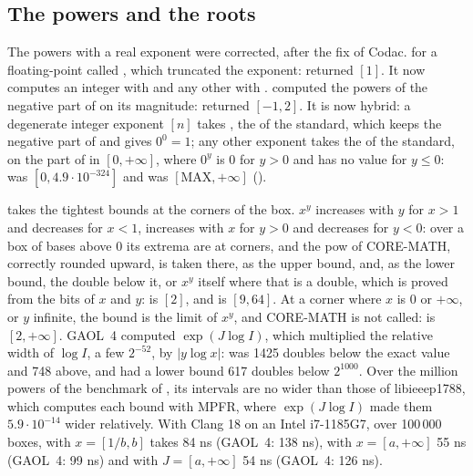 \documentclass[12pt,a4paper,twoside,openright]{book}
\begin{document}
\subsection{The powers and the roots}
\label{sec:changes-powers}
%

The powers with a real exponent were corrected, after the fix of
Codac.\newinvfive{}  for a floating-point  called
, which truncated the exponent: 
returned $[1]$. It now computes an integer  with 
and any other  with .  computed the
powers of the negative part of  on its magnitude:  returned $[-1, 2]$. It is now hybrid: a degenerate integer exponent
$[n]$ takes , the  of the standard, which keeps
the negative part of  and gives $0^0 = 1$; any other exponent takes
the  of the standard, on the part of  in $[0, +\infty]$,
where $0^y$ is 0 for $y > 0$ and has no value for $y \leq 0$:
 was $[0, 4.9 \cdot 10^{-324}]$ and
 was $[\mathrm{MAX}, +\infty]$
().

\medskip
{} takes the tightest bounds at the corners of the
box.\newinvfive{} $x^y$ increases with $y$ for $x > 1$ and decreases for
$x < 1$, increases with $x$ for $y > 0$ and decreases for $y < 0$: over a box
of bases above 0 its extrema are at corners, and the pow of CORE-MATH,
correctly rounded upward, is taken there, as the upper bound, and, as the
lower bound, the double below it, or $x^y$ itself where that is a double,
which is proved from the bits of $x$ and $y$:  is $[2]$,
and  is $[9, 64]$. At a corner where $x$ is 0 or
$+\infty$, or $y$ infinite, the bound is the limit of $x^y$, and CORE-MATH
is not called:  is $[2, +\infty]$. GAOL~4 computed
$\exp(J \log I)$, which multiplied the relative width of $\log I$, a few
$2^{-52}$, by $|y \log x|$:  was 1425 doubles below
the exact value and 748 above, and 
had a lower bound 617 doubles below $2^{1000}$. Over the million powers of
the benchmark of , its intervals are no wider than those of
libieeep1788, which computes each bound with MPFR, where $\exp(J \log I)$
made them $5.9 \cdot 10^{-14}$ wider relatively. With Clang 18 on an Intel
i7-1185G7, over 100\,000 boxes,  with $x = [1/b, b]$
takes 84 ns (GAOL~4: 138 ns), with $x = [a, +\infty]$ 55 ns (GAOL~4: 99 ns)
and with $J = [a, +\infty]$ 54 ns (GAOL~4: 126 ns).
\end{document}
